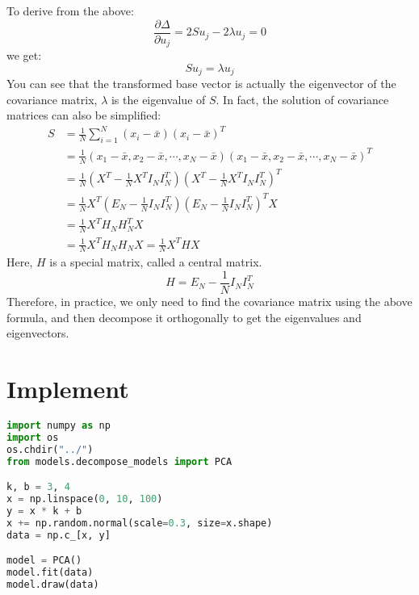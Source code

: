 \documentclass{report}
\begin{document}
To derive from the above:
$$
\frac{\partial \Delta}{\partial u_j}=2S u_j -2\lambda u_j=0
$$
we get:
$$
S u_j = \lambda u_j
$$
You can see that the transformed base vector is actually the eigenvector of the covariance matrix, $\lambda$ is the eigenvalue of $S$.
In fact, the solution of covariance matrices can also be simplified:
$$
\begin{aligned}
S &=\frac{1}{N} \sum_{i=1}^{N}\left(x_{i}-\bar{x}\right)\left(x_{i}-\bar{x}\right)^{T} \\
&=\frac{1}{N}\left(x_{1}-\bar{x}, x_{2}-\bar{x}, \cdots, x_{N}-\bar{x}\right)\left(x_{1}-\bar{x}, x_{2}-\bar{x}, \cdots, x_{N}-\bar{x}\right)^{T} \\
&=\frac{1}{N}\left(X^{T}-\frac{1}{N} X^{T} I_{N} I_{N}^{T}\right)\left(X^{T}-\frac{1}{N} X^{T} I_{N} I_{N}^{T}\right)^{T} \\
&=\frac{1}{N} X^{T}\left(E_{N}-\frac{1}{N} I_{N} I_{N}^T\right)\left(E_{N}-\frac{1}{N} I_{N} I_{N}^T\right)^{T} X \\
&=\frac{1}{N} X^{T} H_{N} H_{N}^{T} X \\
&=\frac{1}{N} X^{T} H_{N} H_{N} X=\frac{1}{N} X^{T} H X
\end{aligned}
$$
Here, $H$ is a special matrix, called a central matrix.
$$
H=E_N - \frac{1}{N}I_N I_N^T
$$
Therefore, in practice, we only need to find the covariance matrix using the above formula, and then decompose it orthogonally to get the eigenvalues and eigenvectors.
\section{Implement}
\begin{lstlisting}[language={python}]
import numpy as np
import os
os.chdir("../")
from models.decompose_models import PCA

k, b = 3, 4
x = np.linspace(0, 10, 100)
y = x * k + b
x += np.random.normal(scale=0.3, size=x.shape)
data = np.c_[x, y]

model = PCA()
model.fit(data)
model.draw(data)
\end{lstlisting}
\end{document}
